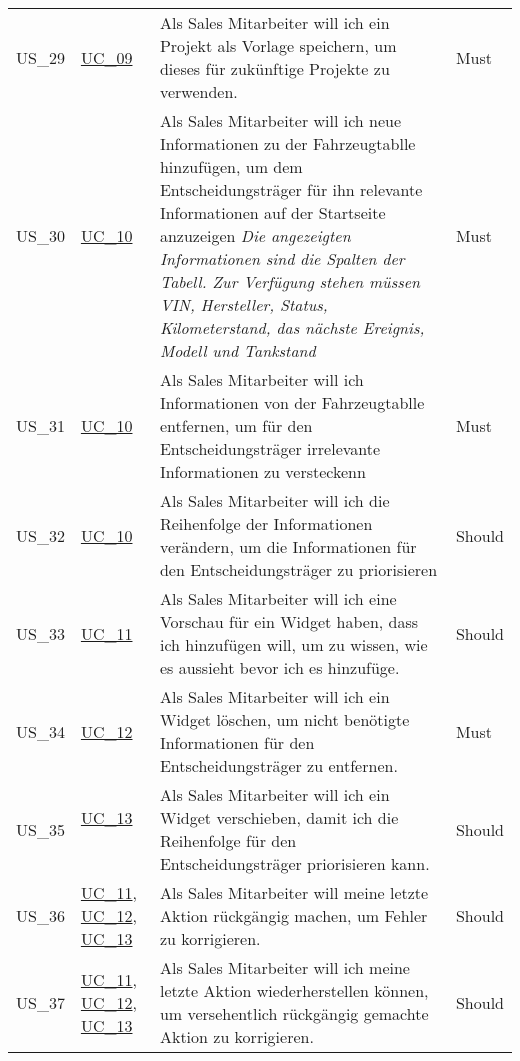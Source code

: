 \begin{footnotesize}
\begin{longtable}[L L L L]{ p{} p{} p{} p{} }
      \hypertarget{Ref:US29}{US\_29} & \hyperlink{Ref:UC9}{UC\_09} & Als Sales Mitarbeiter will ich ein Projekt als Vorlage speichern, um dieses für zukünftige Projekte zu verwenden. & Must \\
      \hypertarget{Ref:US30}{US\_30} & \hyperlink{Ref:UC10}{UC\_10} & Als Sales Mitarbeiter will ich neue Informationen zu der Fahrzeugtablle hinzufügen, um dem Entscheidungsträger für ihn relevante Informationen auf der Startseite anzuzeigen
      \newline\newline
      \emph{Die angezeigten Informationen sind die Spalten der Tabell. Zur Verfügung stehen müssen VIN, Hersteller, Status, Kilometerstand, das nächste Ereignis, Modell und Tankstand} & Must  \\
      \hypertarget{Ref:US31}{US\_31} & \hyperlink{Ref:UC10}{UC\_10} & Als Sales Mitarbeiter will ich Informationen von der Fahrzeugtablle entfernen, um für den Entscheidungsträger irrelevante Informationen zu versteckenn & Must  \\
      \hypertarget{Ref:US32}{US\_32} & \hyperlink{Ref:UC10}{UC\_10} & Als Sales Mitarbeiter will ich die Reihenfolge der Informationen verändern, um die Informationen für den Entscheidungsträger zu priorisieren & Should  \\

      \hypertarget{Ref:US33}{US\_33} & \hyperlink{Ref:UC11}{UC\_11} & Als Sales Mitarbeiter will ich eine Vorschau für ein Widget haben, dass ich hinzufügen will, um zu wissen, wie es aussieht bevor ich es hinzufüge. & Should \\
      \hypertarget{Ref:US34}{US\_34} & \hyperlink{Ref:UC12}{UC\_12} & Als Sales Mitarbeiter will ich ein Widget löschen, um nicht benötigte Informationen für den Entscheidungsträger zu entfernen. & Must \\
      \hypertarget{Ref:US35}{US\_35} & \hyperlink{Ref:UC13}{UC\_13} \  & Als Sales Mitarbeiter will ich ein Widget verschieben, damit ich die Reihenfolge für den Entscheidungsträger priorisieren kann. & Should \\
      \hypertarget{Ref:US36}{US\_36} & \hyperlink{Ref:UC11}{UC\_11}, \newline \hyperlink{Ref:UC12}{UC\_12}, \newline \hyperlink{Ref:UC13}{UC\_13} & Als Sales Mitarbeiter will meine letzte Aktion rückgängig machen, um Fehler zu korrigieren. & Should \\
      \hypertarget{Ref:US37}{US\_37} & \hyperlink{Ref:UC11}{UC\_11}, \newline \hyperlink{Ref:UC12}{UC\_12}, \newline \hyperlink{Ref:UC13}{UC\_13} & Als Sales Mitarbeiter will ich meine letzte Aktion wiederherstellen können, um versehentlich rückgängig gemachte Aktion zu korrigieren. & Should \\
      \bottomrule
    \end{longtable}
  \end{footnotesize}
  \rmfamily

